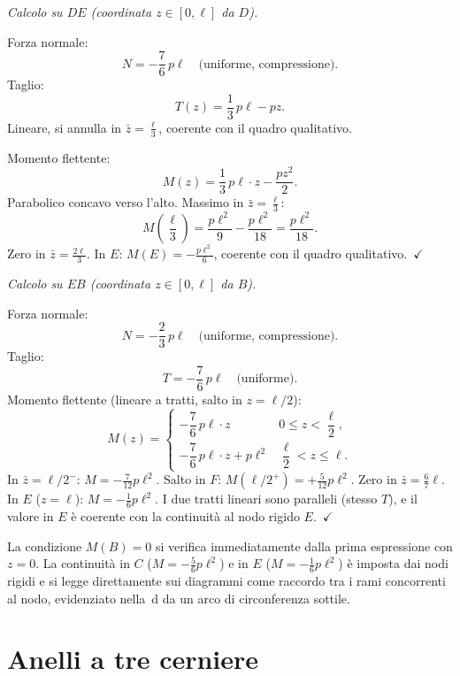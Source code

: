 \medskip
\noindent\textit{Calcolo su $DE$
(coordinata $z \in [0,\ell]$ da $D$).}

\noindent Forza normale:
\[
N = -\frac{7}{6}\,p\ell
\quad\text{(uniforme, compressione).}
\]
Taglio:
\[
T(z) = \frac{1}{3}\,p\ell - pz.
\]
Lineare, si annulla in $\bar{z} = \tfrac{\ell}{3}$,
coerente con il quadro qualitativo.

\noindent Momento flettente:
\[
M(z) = \frac{1}{3}\,p\ell\cdot z - \frac{pz^2}{2}.
\]
Parabolico concavo verso l'alto.
Massimo in $\bar{z} = \tfrac{\ell}{3}$:
\[
M\!\left(\frac{\ell}{3}\right)
= \frac{p\ell^2}{9} - \frac{p\ell^2}{18}
= \frac{p\ell^2}{18}.
\]
Zero in $\bar{z} = \tfrac{2\ell}{3}$.
In $E$: $M(E) = -\tfrac{p\ell^2}{6}$,
coerente con il quadro qualitativo.~$\checkmark$

\medskip
\noindent\textit{Calcolo su $EB$
(coordinata $z \in [0,\ell]$ da $B$).}

\noindent Forza normale:
\[
N = -\frac{2}{3}\,p\ell
\quad\text{(uniforme, compressione).}
\]
Taglio:
\[
T = -\frac{7}{6}\,p\ell
\quad\text{(uniforme).}
\]
Momento flettente (lineare a tratti, salto in
$z = \ell/2$):
\[
M(z) = \begin{cases}
-\dfrac{7}{6}\,p\ell\cdot z
& 0 \le z < \dfrac{\ell}{2},\\[10pt]
-\dfrac{7}{6}\,p\ell\cdot z + p\ell^2
& \dfrac{\ell}{2} < z \le \ell.
\end{cases}
\]
In $\bar{z} = \ell/2^-$:
$M = -\tfrac{7}{12}p\ell^2$.
Salto in $F$: $M(\ell/2^+) = +\tfrac{5}{12}p\ell^2$.
Zero in $\bar{z} = \tfrac{6}{7}\ell$.
In $E$ ($z=\ell$): $M = -\tfrac{1}{6}p\ell^2$.
I due tratti lineari sono paralleli (stesso $T$),
e il valore in $E$ è coerente con la continuità
al nodo rigido $E$.~$\checkmark$

\begin{oss}
La condizione $M(B) = 0$ si verifica
immediatamente dalla prima espressione con $z=0$.
La continuità in $C$ ($M = -\tfrac{5}{6}p\ell^2$)
e in $E$ ($M = -\tfrac{1}{6}p\ell^2$) è imposta
dai nodi rigidi e si legge direttamente sui diagrammi
come raccordo tra i rami concorrenti al nodo,
evidenziato nella \,d
da un arco di circonferenza sottile.
\end{oss}


\section{Anelli a tre cerniere}
\label{sec:anello_tre_cerniere}

